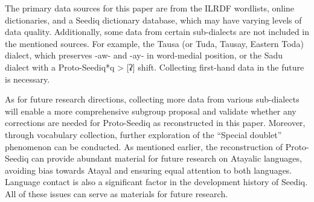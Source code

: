 \documentclass[12pt]{article}
\newcommand{\psedf}{Proto-Seediq\xspace}
\begin{document}
The primary data sources for this paper are from the ILRDF wordlists, online dictionaries, and a Seediq dictionary database, which may have varying levels of data quality. Additionally, some data from certain sub-dialects are not included in the mentioned sources. For example, the Tausa (or Tuda, Tausay, Eastern Toda) dialect, which preserves -aw- and -ay- in word-medial position, or the Sadu dialect with a \psedf *q > [ʡ] shift. Collecting first-hand data in the future is necessary.

As for future research directions, collecting more data from various sub-dialects will enable a more comprehensive subgroup proposal and validate whether any corrections are needed for \psedf as reconstructed in this paper. Moreover, through vocabulary collection, further exploration of the ``Special doublet'' phenomenon can be conducted. As mentioned earlier, the reconstruction of \psedf can provide abundant material for future research on Atayalic languages, avoiding bias towards Atayal and ensuring equal attention to both languages. Language contact is also a significant factor in the development history of Seediq. All of these issues can serve as materials for future research.
\end{document}

